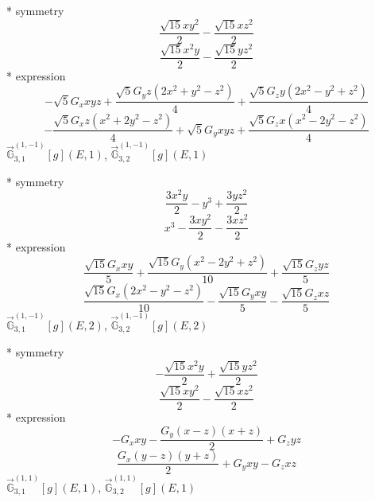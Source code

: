 \documentclass[fleqn,8pt]{jsarticle}
\begin{document}
\noindent\quad ** symmetry
\begin{dmath*}
\frac{\sqrt{15} x y^{2}}{2} - \frac{\sqrt{15} x z^{2}}{2}
\end{dmath*}
\begin{dmath*}
\frac{\sqrt{15} x^{2} y}{2} - \frac{\sqrt{15} y z^{2}}{2}
\end{dmath*}
\noindent\quad ** expression
\begin{dmath*}
- \sqrt{5} G_{x} x y z + \frac{\sqrt{5} G_{y} z \left(2 x^{2} + y^{2} - z^{2}\right)}{4} + \frac{\sqrt{5} G_{z} y \left(2 x^{2} - y^{2} + z^{2}\right)}{4}
\end{dmath*}
\begin{dmath*}
- \frac{\sqrt{5} G_{x} z \left(x^{2} + 2 y^{2} - z^{2}\right)}{4} + \sqrt{5} G_{y} x y z + \frac{\sqrt{5} G_{z} x \left(x^{2} - 2 y^{2} - z^{2}\right)}{4}
\end{dmath*}
\noindent\quad $\vec{\mathbb{G}}_{3,1}^{(1,-1)}[g](E,1)$, $\vec{\mathbb{G}}_{3,2}^{(1,-1)}[g](E,1)$

\noindent\quad ** symmetry
\begin{dmath*}
\frac{3 x^{2} y}{2} - y^{3} + \frac{3 y z^{2}}{2}
\end{dmath*}
\begin{dmath*}
x^{3} - \frac{3 x y^{2}}{2} - \frac{3 x z^{2}}{2}
\end{dmath*}
\noindent\quad ** expression
\begin{dmath*}
\frac{\sqrt{15} G_{x} x y}{5} + \frac{\sqrt{15} G_{y} \left(x^{2} - 2 y^{2} + z^{2}\right)}{10} + \frac{\sqrt{15} G_{z} y z}{5}
\end{dmath*}
\begin{dmath*}
\frac{\sqrt{15} G_{x} \left(2 x^{2} - y^{2} - z^{2}\right)}{10} - \frac{\sqrt{15} G_{y} x y}{5} - \frac{\sqrt{15} G_{z} x z}{5}
\end{dmath*}
\noindent\quad $\vec{\mathbb{G}}_{3,1}^{(1,-1)}[g](E,2)$, $\vec{\mathbb{G}}_{3,2}^{(1,-1)}[g](E,2)$

\noindent\quad ** symmetry
\begin{dmath*}
- \frac{\sqrt{15} x^{2} y}{2} + \frac{\sqrt{15} y z^{2}}{2}
\end{dmath*}
\begin{dmath*}
\frac{\sqrt{15} x y^{2}}{2} - \frac{\sqrt{15} x z^{2}}{2}
\end{dmath*}
\noindent\quad ** expression
\begin{dmath*}
- G_{x} x y - \frac{G_{y} \left(x - z\right) \left(x + z\right)}{2} + G_{z} y z
\end{dmath*}
\begin{dmath*}
\frac{G_{x} \left(y - z\right) \left(y + z\right)}{2} + G_{y} x y - G_{z} x z
\end{dmath*}
\noindent\quad $\vec{\mathbb{G}}_{3,1}^{(1,1)}[g](E,1)$, $\vec{\mathbb{G}}_{3,2}^{(1,1)}[g](E,1)$
\end{document}
